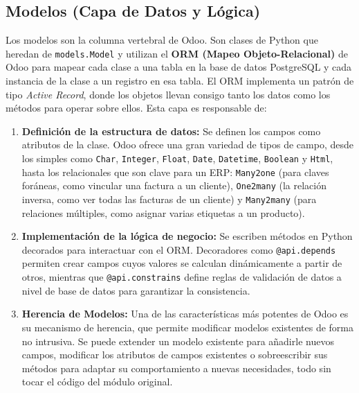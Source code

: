 \documentclass[12pt,letterpaper,spanish]{report}
\begin{document}
\subsection{Modelos (Capa de Datos y Lógica)}
\label{sub:modelos_odoo}
Los modelos son la columna vertebral de Odoo. Son clases de Python que heredan de \texttt{models.Model} y utilizan el \textbf{ORM (Mapeo Objeto-Relacional)} de Odoo para mapear cada clase a una tabla en la base de datos PostgreSQL y cada instancia de la clase a un registro en esa tabla. El ORM implementa un patrón de tipo \textit{Active Record}, donde los objetos llevan consigo tanto los datos como los métodos para operar sobre ellos. Esta capa es responsable de:

\begin{enumerate}
    \item \textbf{Definición de la estructura de datos:} Se definen los campos como atributos de la clase. Odoo ofrece una gran variedad de tipos de campo, desde los simples como \texttt{Char}, \texttt{Integer}, \texttt{Float}, \texttt{Date}, \texttt{Datetime}, \texttt{Boolean} y \texttt{Html}, hasta los relacionales que son clave para un ERP: \texttt{Many2one} (para claves foráneas, como vincular una factura a un cliente), \texttt{One2many} (la relación inversa, como ver todas las facturas de un cliente) y \texttt{Many2many} (para relaciones múltiples, como asignar varias etiquetas a un producto).

    \item \textbf{Implementación de la lógica de negocio:} Se escriben métodos en Python decorados para interactuar con el ORM. Decoradores como \texttt{@api.depends} permiten crear campos cuyos valores se calculan dinámicamente a partir de otros, mientras que \texttt{@api.constrains} define reglas de validación de datos a nivel de base de datos para garantizar la consistencia.

    \item \textbf{Herencia de Modelos:} Una de las características más potentes de Odoo es su mecanismo de herencia, que permite modificar modelos existentes de forma no intrusiva. Se puede extender un modelo existente para añadirle nuevos campos, modificar los atributos de campos existentes o sobreescribir sus métodos para adaptar su comportamiento a nuevas necesidades, todo sin tocar el código del módulo original.
\end{enumerate}
\end{document}
